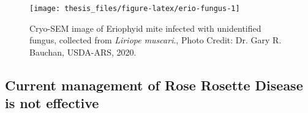 \documentclass{ufdissertation}[overrideChapters] %
\begin{document}
{\begin{figure}
{\centering \texttt{[image: thesis\_files/figure-latex/erio-fungus-1]} 

}

\caption[Cryo-SEM image of Eriophyid mite infected with unidentified fungus]{Cryo-SEM image of Eriophyid mite infected with unidentified fungus, collected from \textit{Liriope muscari}., Photo Credit: Dr. Gary R. Bauchan, USDA-ARS, 2020.}\label{fig:erio-fungus}
\end{figure}
\hypertarget{current-management-of-rose-rosette-disease-is-not-effective}{%
\subsection{Current management of Rose Rosette Disease is not effective}\label{current-management-of-rose-rosette-disease-is-not-effective}}

}
\end{document}
